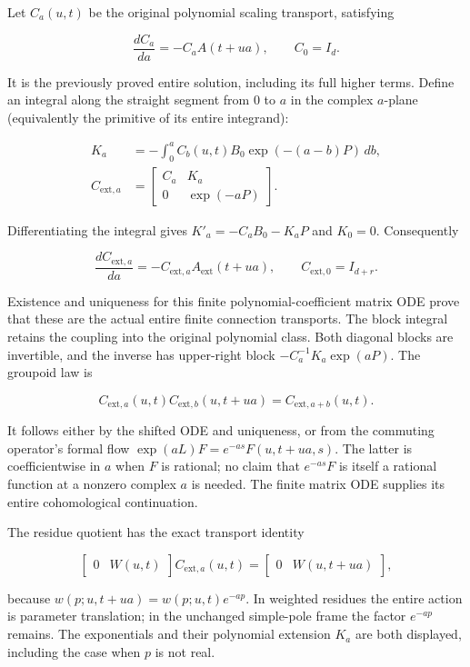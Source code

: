 Let \(C_a(u,t)\) be the original polynomial scaling transport, satisfying

\[
\frac{dC_a}{da}=-C_a A(t+ua),\qquad C_0=I_d.
\tag{AP14}
\]

It is the previously proved entire solution, including its full higher terms. Define an integral along the straight segment from \(0\) to \(a\) in the complex \(a\)-plane (equivalently the primitive of its entire integrand):

\[
\begin{aligned}
K_a&=-\int_0^a C_b(u,t)B_0\exp(-(a-b)P)\,db,\\
C_{\mathrm{ext},a}&=\begin{bmatrix}C_a&K_a\\0&\exp(-aP)\end{bmatrix}.
\end{aligned}
\tag{AP15}
\]

Differentiating the integral gives \(K'_a=-C_a B_0-K_a P\) and \(K_0=0\). Consequently

\[
\frac{dC_{\mathrm{ext},a}}{da}
=-C_{\mathrm{ext},a}A_{\mathrm{ext}}(t+ua),
\qquad C_{\mathrm{ext},0}=I_{d+r}.
\tag{AP16}
\]

Existence and uniqueness for this finite polynomial-coefficient matrix ODE prove that these are the actual entire finite connection transports. The block integral retains the coupling into the original polynomial class. Both diagonal blocks are invertible, and the inverse has upper-right block \(-C_a^{-1}K_a\exp(aP)\). The groupoid law is

\[
C_{\mathrm{ext},a}(u,t)C_{\mathrm{ext},b}(u,t+ua)
=C_{\mathrm{ext},a+b}(u,t).
\tag{AP17}
\]

It follows either by the shifted ODE and uniqueness, or from the commuting operator's formal flow \(\exp(aL)F=e^{-as}F(u,t+ua,s)\). The latter is coefficientwise in \(a\) when \(F\) is rational; no claim that \(e^{-as}F\) is itself a rational function at a nonzero complex \(a\) is needed. The finite matrix ODE supplies its entire cohomological continuation.

The residue quotient has the exact transport identity

\[
\begin{bmatrix}0&W(u,t)\end{bmatrix}C_{\mathrm{ext},a}(u,t)
=\begin{bmatrix}0&W(u,t+ua)\end{bmatrix},
\tag{AP18}
\]

because \(w(p;u,t+ua)=w(p;u,t)e^{-ap}\). In weighted residues the entire action is parameter translation; in the unchanged simple-pole frame the factor \(e^{-ap}\) remains. The exponentials and their polynomial extension \(K_a\) are both displayed, including the case when \(p\) is not real.

